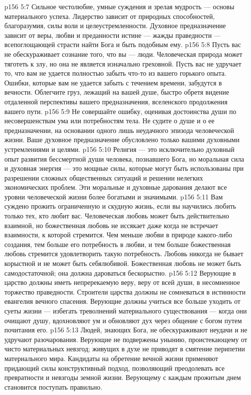 \vs p156 5:7 Сильное честолюбие, умные суждения и зрелая мудрость --- основы материального успеха. Лидерство зависит от природных способностей, благоразумия, силы воли и целеустремленности. Духовное предназначение зависит от веры, любви и преданности истине --- жажды праведности --- всепоглощающей страсти найти Бога и быть подобным ему.
\vs p156 5:8 Пусть вас не обескураживает сознание того, что вы --- люди. Человеческая природа может тяготеть к злу, но она не является изначально греховной. Пусть вас не удручает то, что вам не удается полностью забыть что\hyp{}то из вашего горького опыта. Ошибки, которые вам не удается забыть с течением времени, забудутся в вечности. Облегчите груз, лежащий на вашей душе, быстро обретя видение отдаленной перспективы вашего предназначения, вселенского продолжения вашего пути.
\vs p156 5:9 Не совершайте ошибку, оценивая достоинства души по несовершенствам ума или потребностям тела. Не судите о душе и о ее предназначении, на основании одного лишь неудачного эпизода человеческой жизни. Ваше духовное предназначение обусловлено только вашими духовными устремлениями и целями.
\vs p156 5:10 Религия --- это исключительно духовный опыт развития бессмертной души человека, познавшего Бога, но моральная сила и духовная энергия --- это мощные силы, которые могут быть использованы при разрешении сложных общественных ситуаций и решении нелегких экономических проблем. Эти моральные и духовные дарования делают все уровни человеческой жизни более богатыми и значимыми.
\vs p156 5:11 Вам суждено прожить ограниченную и скудную жизнь, если вы научились любить только тех, кто любит вас. Человеческая любовь может быть действительно взаимной, но божественная любовь не иссякает даже когда не встречает взаимности, к которой стремится. Чем меньше любви в природе какого\hyp{}либо создания, тем больше его потребность в любви, и тем больше божественная любовь стремится удовлетворить такую потребность. Любовь никогда не бывает корыстной и не может быть себялюбивой. Божественная любовь не может быть самодостаточной; она должна дароваться бескорыстно.
\vs p156 5:12 Верующие в царство должны иметь непререкаемую веру, веру от всей души, в несомненное торжество праведности. Строители царства должны не сомневаться в истинности евангелия вечного спасения. Верующие должны учиться все больше уходить от суеты жизни --- избегать треволнений материального существования --- когда они очищают душу, вдохновляют ум и обновляют дух через общение с богом путем почитания его.
\vs p156 5:13 Людей, знающих Бога, не обескураживают неудачи и не удручают разочарования. Верующие не подвержены унынию, проистекающему от чисто материальных невзгод; живущих в духе не приводят в смятение перипетии материального мира. Кандидаты на обретение вечной жизни применяют придающий силы конструктивный подход, позволяющий преодолевать все превратности и невзгоды земной жизни. Верующему с каждым прожитым днем становится  поступать правильно.
